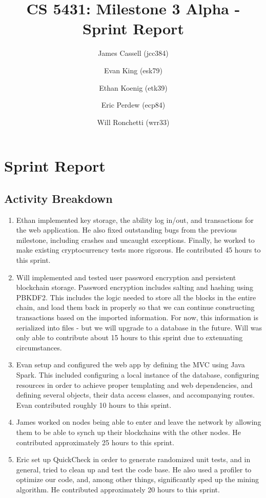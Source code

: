 \documentclass[a4paper,12pt]{article}
\title{CS 5431: Milestone 3 Alpha - Sprint Report}
\author{
James Cassell (jcc384)
\and
Evan King (esk79)
\and
Ethan Koenig (etk39)
\and
Eric Perdew (ecp84)
\and
Will Ronchetti (wrr33)
}
\begin{document}
\maketitle

\section{Sprint Report}

\subsection{Activity Breakdown}

\begin{enumerate}
\item Ethan implemented key storage, the ability log in/out, and transactions for the web application. He also fixed outstanding bugs from the previous milestone, including crashes and uncaught exceptions. Finally, he worked to make existing cryptocurrency tests more rigorous. He contributed 45 hours to this sprint.
\item Will implemented and tested user password encryption and persistent blockchain storage. Password encryption includes salting and hashing using PBKDF2. This includes the logic needed to store all the blocks in the entire chain, and load them back in properly so that we can continue constructing transactions based on the imported information. For now, this information is serialized into files - but we will upgrade to a database in the future. Will was only able to contribute about 15 hours to this sprint due to extenuating circumstances.
\item Evan setup and configured the web app by defining the MVC using Java Spark. This included configuring a local instance of the database, configuring resources in order to achieve proper templating and web dependencies, and defining several objects, their data access classes, and accompanying routes. Evan contributed roughly 10 hours to this sprint. %
\item James worked on nodes being able to enter and leave the network by allowing them to be able to synch up their blockchains with the other nodes.
He contributed approximately 25 hours to this sprint.
\item  Eric set up QuickCheck in order to generate randomized unit tests, and in general, tried to clean up and test the code base. He also used a profiler to optimize our code, and, among other things, significantly sped up the mining algorithm. He contributed approximately 20 hours to this sprint.
\end{enumerate}
\end{document}
